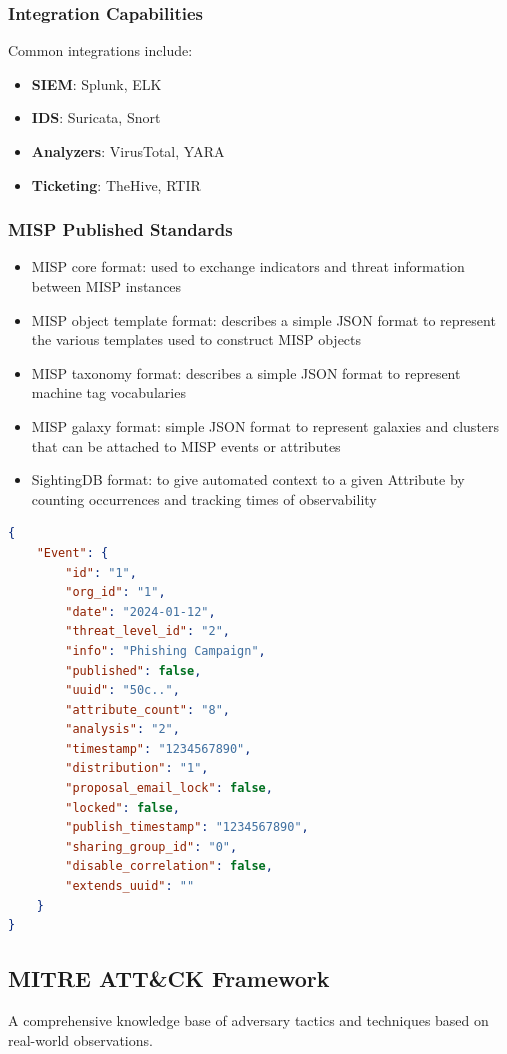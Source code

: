 \subsubsection{Integration Capabilities}
Common integrations include:
\begin{itemize}
    \item \textbf{SIEM}: Splunk, ELK
    \item \textbf{IDS}: Suricata, Snort
    \item \textbf{Analyzers}: VirusTotal, YARA
    \item \textbf{Ticketing}: TheHive, RTIR
\end{itemize}

\subsubsection{MISP Published Standards}
\begin{itemize}
  \item MISP core format: used to exchange indicators and threat information between MISP instances
  \item MISP object template format: describes a simple JSON format to represent the various templates used to construct MISP objects
  \item MISP taxonomy format: describes a simple JSON format to represent machine tag vocabularies
  \item MISP galaxy format: simple JSON format to represent galaxies and clusters that can be attached to MISP events or attributes
  \item SightingDB format: to give automated context to a given Attribute by counting occurrences and tracking times of observability
\end{itemize}

\begin{lstlisting}[language=JSON]
{
    "Event": {
        "id": "1",
        "org_id": "1",
        "date": "2024-01-12",
        "threat_level_id": "2",
        "info": "Phishing Campaign",
        "published": false,
        "uuid": "50c..",
        "attribute_count": "8",
        "analysis": "2",
        "timestamp": "1234567890",
        "distribution": "1",
        "proposal_email_lock": false,
        "locked": false,
        "publish_timestamp": "1234567890",
        "sharing_group_id": "0",
        "disable_correlation": false,
        "extends_uuid": ""
    }
}
\end{lstlisting}

\subsection{MITRE ATT\&CK Framework}
A comprehensive knowledge base of adversary tactics and techniques based on real-world observations.

